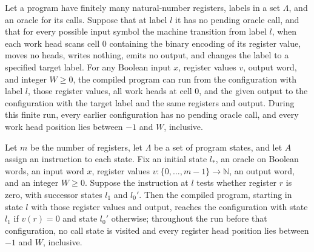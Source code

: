 \begin{lemma}
\label{Complexity.LogProg.sim_go}
\leanok
{}
Let a program have finitely many natural-number registers, labels in a set $\Lambda$,
and an oracle for its calls. Suppose that at label $l$ it has no pending oracle call,
and that for every possible input symbol the machine transition from label $l$, when
each work head scans cell $0$ containing the binary encoding of its register value,
moves no heads, writes nothing, emits no output, and changes the label to a specified
target label. For any Boolean input $x$, register values $v$, output word, and integer
$W\ge 0$, the compiled program can run from the configuration with label $l$, those
register values, all work heads at cell $0$, and the given output to the configuration
with the target label and the same registers and output. During this finite run, every
earlier configuration has no pending oracle call, and every work head position lies
between $-1$ and $W$, inclusive.
\end{lemma}

\begin{lemma}
\label{Complexity.LogProg.sim_jz}
\leanok
{}
Let $m$ be the number of registers, let $\Lambda$ be a set of program states, and let
$A$ assign an instruction to each state. Fix an initial state $l_*$, an oracle on
Boolean words, an input word $x$, register values
$v\colon\{0,\ldots,m-1\}\to\mathbb{N}$, an output word, and an integer $W\ge 0$. Suppose
the instruction at $l$ tests whether register $r$ is zero, with successor states $l_1$
and $l_0'$. Then the compiled program, starting in state $l$ with those register values
and output, reaches the configuration with state $l_1$ if $v(r)=0$ and state $l_0'$
otherwise; throughout the run before that configuration, no call state is visited and
every register head position lies between $-1$ and $W$, inclusive.
\end{lemma}


